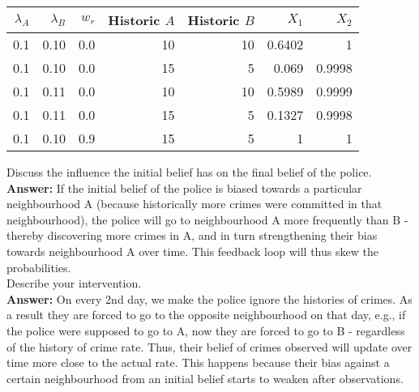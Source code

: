 \begin{center}
	\begin{tabular}{r r r r r r  r }
		\toprule
		$\lambda_A$ & $\lambda_B$  &$w_r$ & Historic $A$ & Historic $B$ &  $X_1$ & $X_2$  \\
		\midrule
		0.1 & 0.10 & 0.0 & 10 & 10 & 0.6402 & 1\\
		0.1 & 0.10 & 0.0 & 15 & 5 & 0.069 & 0.9998\\
		0.1 & 0.11 & 0.0 & 10 & 10 & 0.5989 & 0.9999\\
		0.1 & 0.11 & 0.0 & 15 & 5 & 0.1327 & 0.9998\\
		0.1 & 0.10 & 0.9 & 15 & 5 & 1 & 1\\
		\bottomrule
	\end{tabular}
\end{center}


Discuss the influence the initial belief has on the final belief of the police.\\

\textbf{Answer:}
If the initial belief of the police is biased towards a particular neighbourhood A (because historically more crimes were committed in that neighbourhood), the police will go to neighbourhood A more frequently than B - thereby discovering more crimes in A, and in turn strengthening their bias towards neighbourhood A over time. This feedback loop will thus skew the probabilities. \\


Describe your intervention.\\

\textbf{Answer:} On every 2nd day, we make the police ignore the histories of crimes. As a result they are forced to go to the opposite neighbourhood on that day, e.g., if the police were supposed to go to A, now they are forced to go to B - regardless of the history of crime rate. Thus, their belief of crimes observed will update over time more close to the actual rate. This happens because their bias against a certain neighbourhood from an initial belief starts to weaken after observations.




